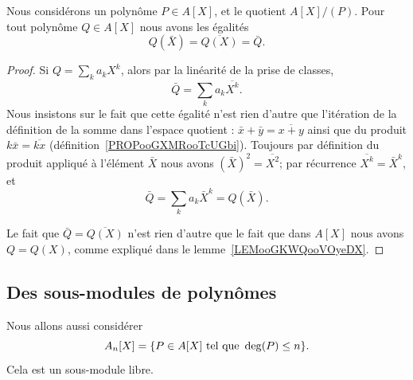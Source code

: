 \begin{lemma}       \label{LEMooXFMAooMBgIrN}
    Nous considérons un polynôme \( P\in A[X]\), et le quotient \( A[X]/(P)\). Pour tout polynôme \( Q\in A[X]\) nous avons les égalités
    \begin{equation}
        Q(\bar X)=\overline{ Q(X) }=\bar Q.
    \end{equation}
\end{lemma}

\begin{proof}
    Si \( Q=\sum_ka_kX^k\), alors par la linéarité de la prise de classes,
    \begin{equation}        \label{EQooXQRMooIPGFVM}
        \bar Q=\sum_ka_k\overline{ X^k }.
    \end{equation}
    Nous insistons sur le fait que cette égalité n'est rien d'autre que l'itération de la définition de la somme dans l'espace quotient : \( \bar x+\bar y=\overline{ x+y }\) ainsi que du produit \( k\bar x=\overline{ kx }\) (définition~\ref{PROPooGXMRooTcUGbi}). Toujours par définition du produit appliqué à l'élément \( \bar X\) nous avons \( (\bar X)^2=\overline{ X^2 }\); par récurrence \( \overline{ X^k }=\bar X^k\), et
    \begin{equation}
        \bar Q=\sum_ka_k\bar X^k=Q(\bar X).
    \end{equation}

    Le fait que \( \bar Q=\overline{ Q(X) }\) n'est rien d'autre que le fait que dans \( A[X]\) nous avons \( Q=Q(X)\), comme expliqué dans le lemme~\ref{LEMooGKWQooVOyeDX}.
\end{proof}

\subsection{Des sous-modules de polynômes}

\begin{normaltext}
Nous allons aussi considérer
\begin{equation}
    A_n[X]=\{ P\in A[X]\text{ tel que } \deg(P)\leq n \}.
\end{equation}
Cela est un sous-module libre.
\end{normaltext}

